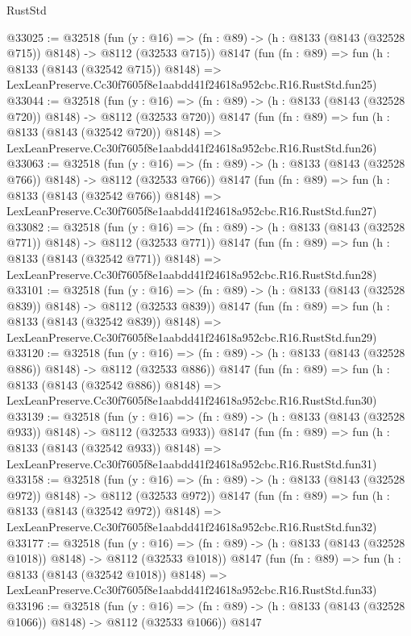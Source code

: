 \begin{lexlean}{RustStd}
\begin{coremodule}
@33025 := @32518
    (fun (y : @16) => (fn : @89) -> (h : @8133 (@8143 (@32528 @715)) @8148) -> @8112 (@32533 @715))
    @8147
    (fun (fn : @89) =>
    fun (h : @8133 (@8143 (@32542 @715)) @8148) =>
    LexLeanPreserve.Cc30f7605f8e1aabdd41f24618a952cbc.R16.RustStd.fun25)
@33044 := @32518
    (fun (y : @16) => (fn : @89) -> (h : @8133 (@8143 (@32528 @720)) @8148) -> @8112 (@32533 @720))
    @8147
    (fun (fn : @89) =>
    fun (h : @8133 (@8143 (@32542 @720)) @8148) =>
    LexLeanPreserve.Cc30f7605f8e1aabdd41f24618a952cbc.R16.RustStd.fun26)
@33063 := @32518
    (fun (y : @16) => (fn : @89) -> (h : @8133 (@8143 (@32528 @766)) @8148) -> @8112 (@32533 @766))
    @8147
    (fun (fn : @89) =>
    fun (h : @8133 (@8143 (@32542 @766)) @8148) =>
    LexLeanPreserve.Cc30f7605f8e1aabdd41f24618a952cbc.R16.RustStd.fun27)
@33082 := @32518
    (fun (y : @16) => (fn : @89) -> (h : @8133 (@8143 (@32528 @771)) @8148) -> @8112 (@32533 @771))
    @8147
    (fun (fn : @89) =>
    fun (h : @8133 (@8143 (@32542 @771)) @8148) =>
    LexLeanPreserve.Cc30f7605f8e1aabdd41f24618a952cbc.R16.RustStd.fun28)
@33101 := @32518
    (fun (y : @16) => (fn : @89) -> (h : @8133 (@8143 (@32528 @839)) @8148) -> @8112 (@32533 @839))
    @8147
    (fun (fn : @89) =>
    fun (h : @8133 (@8143 (@32542 @839)) @8148) =>
    LexLeanPreserve.Cc30f7605f8e1aabdd41f24618a952cbc.R16.RustStd.fun29)
@33120 := @32518
    (fun (y : @16) => (fn : @89) -> (h : @8133 (@8143 (@32528 @886)) @8148) -> @8112 (@32533 @886))
    @8147
    (fun (fn : @89) =>
    fun (h : @8133 (@8143 (@32542 @886)) @8148) =>
    LexLeanPreserve.Cc30f7605f8e1aabdd41f24618a952cbc.R16.RustStd.fun30)
@33139 := @32518
    (fun (y : @16) => (fn : @89) -> (h : @8133 (@8143 (@32528 @933)) @8148) -> @8112 (@32533 @933))
    @8147
    (fun (fn : @89) =>
    fun (h : @8133 (@8143 (@32542 @933)) @8148) =>
    LexLeanPreserve.Cc30f7605f8e1aabdd41f24618a952cbc.R16.RustStd.fun31)
@33158 := @32518
    (fun (y : @16) => (fn : @89) -> (h : @8133 (@8143 (@32528 @972)) @8148) -> @8112 (@32533 @972))
    @8147
    (fun (fn : @89) =>
    fun (h : @8133 (@8143 (@32542 @972)) @8148) =>
    LexLeanPreserve.Cc30f7605f8e1aabdd41f24618a952cbc.R16.RustStd.fun32)
@33177 := @32518
    (fun (y : @16) =>
    (fn : @89) -> (h : @8133 (@8143 (@32528 @1018)) @8148) -> @8112 (@32533 @1018))
    @8147
    (fun (fn : @89) =>
    fun (h : @8133 (@8143 (@32542 @1018)) @8148) =>
    LexLeanPreserve.Cc30f7605f8e1aabdd41f24618a952cbc.R16.RustStd.fun33)
@33196 := @32518
    (fun (y : @16) =>
    (fn : @89) -> (h : @8133 (@8143 (@32528 @1066)) @8148) -> @8112 (@32533 @1066))
    @8147

\end{coremodule}
\end{lexlean}
